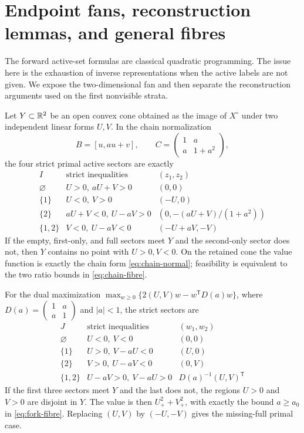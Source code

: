 \section{Endpoint fans, reconstruction lemmas, and general fibres}\label{sec:endpoint-completion}
The forward active-set formulas are classical quadratic programming. The issue here is the exhaustion of inverse representations when the active labels are not given. We expose the two-dimensional fan and then separate the reconstruction arguments used on the first nonvisible strata.

\begin{lemma}\label{lem:planar-fan}
Let $Y\subset\mathbb R^2$ be an open convex cone obtained as the image of $X^\circ$ under two independent linear forms $U,V$. In the chain normalization
\[
 B=[u,au+v],\qquad C=\begin{pmatrix}1&a\\a&1+a^2\end{pmatrix},
\]
the four strict primal active sectors are exactly
\[
\begin{array}{c|c|c}
 I&\text{strict inequalities}&(z_1,z_2)\\\hline
 \varnothing&U>0,\ aU+V>0&(0,0)\\
 \{1\}&U<0,\ V>0&(-U,0)\\
 \{2\}&aU+V<0,\ U-aV>0&(0,-(aU+V)/(1+a^2))\\
 \{1,2\}&V<0,\ U-aV<0&(-U+aV,-V)
\end{array}
\]
If the empty, first-only, and full sectors meet $Y$ and the second-only sector does not, then $Y$ contains no point with $U>0,V<0$. On the retained cone the value function is exactly the chain form \eqref{eq:chain-normal}; feasibility is equivalent to the two ratio bounds in \eqref{eq:chain-fibre}.

For the dual maximization $\max_{w\ge0}\{2(U,V)w-w^{\mathsf T}D(a)w\}$, where $D(a)=\left(\begin{smallmatrix}1&a\\a&1\end{smallmatrix}\right)$ and $|a|<1$, the strict sectors are
\[
\begin{array}{c|c|c}
 J&\text{strict inequalities}&(w_1,w_2)\\\hline
 \varnothing&U<0,\ V<0&(0,0)\\
 \{1\}&U>0,\ V-aU<0&(U,0)\\
 \{2\}&V>0,\ U-aV<0&(0,V)\\
 \{1,2\}&U-aV>0,\ V-aU>0&D(a)^{-1}(U,V)^{\mathsf T}
\end{array}
\]
If the first three sectors meet $Y$ and the last does not, the regions $U>0$ and $V>0$ are disjoint in $Y$. The value is then $U_+^2+V_+^2$, with exactly the bound $a\ge a_0$ in \eqref{eq:fork-fibre}. Replacing $(U,V)$ by $(-U,-V)$ gives the missing-full primal case.
\end{lemma}
